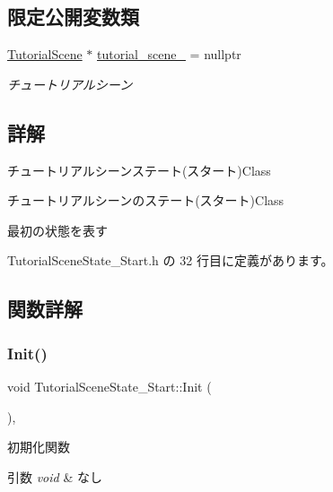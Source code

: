 \subsection*{限定公開変数類}
\begin{DoxyCompactItemize}
\item 
\mbox{\hyperlink{class_tutorial_scene}{Tutorial\+Scene}} $\ast$ \mbox{\hyperlink{class_tutorial_scene_state___start_a1fea5f4f4713a1461a86cbc9fc263e41}{tutorial\+\_\+scene\+\_\+}} = nullptr
\begin{DoxyCompactList}\small\item\em チュートリアルシーン \end{DoxyCompactList}\end{DoxyCompactItemize}


\subsection{詳解}
チュートリアルシーンステート(スタート)Class 

チュートリアルシーンのステート(スタート)Class

最初の状態を表す 

 Tutorial\+Scene\+State\+\_\+\+Start.\+h の 32 行目に定義があります。



\subsection{関数詳解}
\mbox{\label{class_tutorial_scene_state___start_acd4cd7e4efeebffa9616d7ca31c7b1c0}} 
\subsubsection{\texorpdfstring{Init()}{Init()}}
{\footnotesize\ttfamily void Tutorial\+Scene\+State\+\_\+\+Start\+::\+Init (\begin{DoxyParamCaption}{ }\end{DoxyParamCaption})\hspace{0.3cm}{\ttfamily [override]}, {\ttfamily [virtual]}}



初期化関数 


\begin{DoxyParams}{引数}
{\em void} & なし \\
\hline
\end{DoxyParams}

